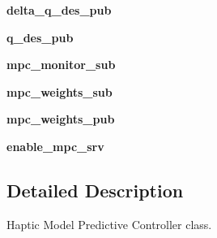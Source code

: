 \begin{DoxyCompactItemize}
\item 
\hypertarget{classhrl__haptic__mpc_1_1haptic__mpc_1_1_haptic_m_p_c_a24ee33d75e4821719a72233d89b21f4b}{{\bfseries delta\-\_\-q\-\_\-des\-\_\-pub}}\label{classhrl__haptic__mpc_1_1haptic__mpc_1_1_haptic_m_p_c_a24ee33d75e4821719a72233d89b21f4b}

\item 
\hypertarget{classhrl__haptic__mpc_1_1haptic__mpc_1_1_haptic_m_p_c_a3fba998abb221562bdef463a55ebc9df}{{\bfseries q\-\_\-des\-\_\-pub}}\label{classhrl__haptic__mpc_1_1haptic__mpc_1_1_haptic_m_p_c_a3fba998abb221562bdef463a55ebc9df}

\item 
\hypertarget{classhrl__haptic__mpc_1_1haptic__mpc_1_1_haptic_m_p_c_ac2959d1539347983da6523e76e8b3d54}{{\bfseries mpc\-\_\-monitor\-\_\-sub}}\label{classhrl__haptic__mpc_1_1haptic__mpc_1_1_haptic_m_p_c_ac2959d1539347983da6523e76e8b3d54}

\item 
\hypertarget{classhrl__haptic__mpc_1_1haptic__mpc_1_1_haptic_m_p_c_a5184fba62ed15c7f47bb2d48adb2d92a}{{\bfseries mpc\-\_\-weights\-\_\-sub}}\label{classhrl__haptic__mpc_1_1haptic__mpc_1_1_haptic_m_p_c_a5184fba62ed15c7f47bb2d48adb2d92a}

\item 
\hypertarget{classhrl__haptic__mpc_1_1haptic__mpc_1_1_haptic_m_p_c_aa5b84121c547a7782e796e0c5244e54b}{{\bfseries mpc\-\_\-weights\-\_\-pub}}\label{classhrl__haptic__mpc_1_1haptic__mpc_1_1_haptic_m_p_c_aa5b84121c547a7782e796e0c5244e54b}

\item 
\hypertarget{classhrl__haptic__mpc_1_1haptic__mpc_1_1_haptic_m_p_c_a2bea817fef1869b3c7acdb89561a17ed}{{\bfseries enable\-\_\-mpc\-\_\-srv}}\label{classhrl__haptic__mpc_1_1haptic__mpc_1_1_haptic_m_p_c_a2bea817fef1869b3c7acdb89561a17ed}

\end{DoxyCompactItemize}


\subsection{\-Detailed \-Description}
\-Haptic \-Model \-Predictive \-Controller class. 



